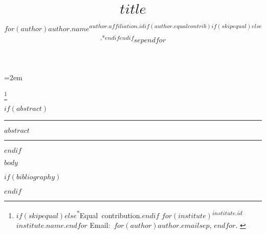 \documentclass[letterpaper,twocolumn,10pt]{article}
\title{$title$}
\author{$for(author)$$author.name$\textsuperscript{$author.affiliation.id$$if(author.equalcontrib)$$if(skipequal)$$else$,*$endif$$endif$}$sep$\quad $endfor$}
\date{}
\newcommand\blfootnote[1]{%
  \begingroup
  \renewcommand\thefootnote{}\footnote{\raggedright\hspace{-2em} #1}%
  \addtocounter{footnote}{-1}%
  \endgroup
}
\begin{document}
\maketitle

\thispagestyle{fancy}
\parindent=2em
\setnowidow[2]

\blfootnote{%
  {%
    \normalfont\sffamily\scriptsize%
    $if(skipequal)$$else$\mbox{\textsuperscript{*}Equal contribution.}\enskip$endif$%
    $for(institute)$\mbox{\textsuperscript{$institute.id$}$institute.name$.}\enskip$endfor$%
    Email:~$for(author)$\mbox{\texttt{$author.email$}}$sep$, $endfor$.%
  }%
}

$if(abstract)$
\hrule height 1pt
\vspace{1ex}%
{\parindent=0pt \normalfont\sffamily\small $abstract$}
\vspace{1ex}%
\hrule height 1pt
\vspace{1ex}
$endif$

$body$

$if(bibliography)$
\footnotesize


$endif$
\end{document}
